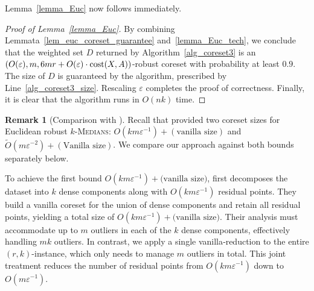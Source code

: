 \documentclass[11pt,letterpaper]{article}
\theoremstyle{definition}
\newtheorem{remark}[theorem]{Remark}
\newcommand{\eps}{\varepsilon}
\newcommand{\ProblemName}[1]{\textsc{#1}}
\newcommand{\kMedian}{\ProblemName{$k$-Medians}\xspace}
\begin{document}
Lemma~\ref{lemma_Euc} now follows immediately.

\begin{proof}[Proof of Lemma~\ref{lemma_Euc}]
By combining Lemmata~\ref{lem_euc_coreset_guarantee} and~\ref{lemma_Euc_tech}, we conclude that the weighted set $D$ returned by Algorithm~\ref{alg_coreset3} is an $(O(\eps),m,6mr + O(\eps)\cdot\cost(X,A))$-robust coreset with probability at least $0.9$. The size of $D$ is guaranteed by the algorithm, prescribed by Line~\ref{alg_coreset3_size}. Rescaling $\eps$ completes the proof of correctness. Finally, it is clear that the algorithm runs in $O(nk)$ time.
\end{proof}

\begin{remark}[Comparison with \cite{jiang2025coresets}]
\label{remark:comparison}
Recall that \cite{jiang2025coresets} provided two coreset sizes for Euclidean robust \kMedian: $O(km\eps^{-1}) + (\text{vanilla size})$ and $\tilde{O}(m\eps^{-2}) + (\text{Vanilla size})$. We compare our approach against both bounds separately below.
%

To achieve the first bound \(O(km\eps^{-1}) + \text{(vanilla size)}\), \cite{jiang2025coresets} first decomposes the dataset into \(k\) dense components along with \(O(km\eps^{-1})\) residual points.  
%
They build a vanilla coreset for the union of dense components and retain all residual points, yielding a total size of \(O(km\eps^{-1}) + \text{(vanilla size)}\).  
%
Their analysis must accommodate up to \(m\) outliers in each of the \(k\) dense components, effectively handling \(mk\) outliers. 
%
In contrast, we apply a single vanilla‐reduction to the entire \((r,k)\)-instance, which only needs to manage \(m\) outliers in total.  
%
This joint treatment reduces the number of residual points from \(O(km\eps^{-1})\) down to \(O(m\eps^{-1})\).
% 


\end{remark}
\end{document}
